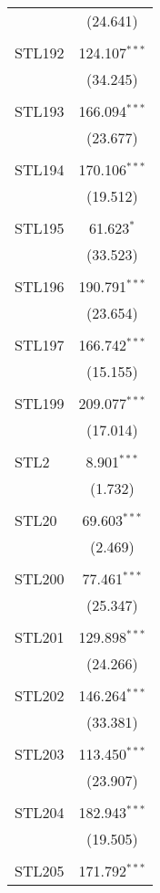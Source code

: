 \begin{table}[!htbp]
\begin{tabular}{@{\extracolsep{5pt}}lc}
  & (24.641) \\ 
  & \\ 
 STL192 & 124.107$^{***}$ \\ 
  & (34.245) \\ 
  & \\ 
 STL193 & 166.094$^{***}$ \\ 
  & (23.677) \\ 
  & \\ 
 STL194 & 170.106$^{***}$ \\ 
  & (19.512) \\ 
  & \\ 
 STL195 & 61.623$^{*}$ \\ 
  & (33.523) \\ 
  & \\ 
 STL196 & 190.791$^{***}$ \\ 
  & (23.654) \\ 
  & \\ 
 STL197 & 166.742$^{***}$ \\ 
  & (15.155) \\ 
  & \\ 
 STL199 & 209.077$^{***}$ \\ 
  & (17.014) \\ 
  & \\ 
 STL2 & 8.901$^{***}$ \\ 
  & (1.732) \\ 
  & \\ 
 STL20 & 69.603$^{***}$ \\ 
  & (2.469) \\ 
  & \\ 
 STL200 & 77.461$^{***}$ \\ 
  & (25.347) \\ 
  & \\ 
 STL201 & 129.898$^{***}$ \\ 
  & (24.266) \\ 
  & \\ 
 STL202 & 146.264$^{***}$ \\ 
  & (33.381) \\ 
  & \\ 
 STL203 & 113.450$^{***}$ \\ 
  & (23.907) \\ 
  & \\ 
 STL204 & 182.943$^{***}$ \\ 
  & (19.505) \\ 
  & \\ 
 STL205 & 171.792$^{***}$ \\ 

\end{tabular}
\end{table}
